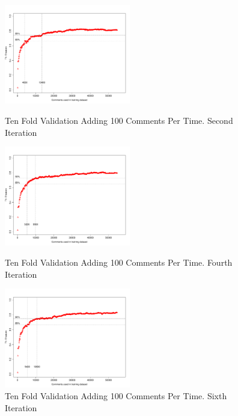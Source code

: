 \begin{figure}[thb!]
  \centering
  \vspace{-14mm}
  \includegraphics[width=0.49\textwidth]{figures/appendix/ten_fold_validation_design/ten_fold_validation_1_100.pdf}
  \vspace{-5mm}
  \caption{Ten Fold Validation Adding 100 Comments Per Time. Second Iteration}
  \label{fig:design_ten_fold_validation_1_100}
  \includegraphics[width=0.49\textwidth]{figures/appendix/ten_fold_validation_design/ten_fold_validation_3_100.pdf}
  \vspace{-5mm}
  \caption{Ten Fold Validation Adding 100 Comments Per Time. Fourth Iteration}
  \label{fig:design_ten_fold_validation_3_100}
  \includegraphics[width=0.49\textwidth]{figures/appendix/ten_fold_validation_design/ten_fold_validation_5_100.pdf}
  \vspace{-5mm}
  \caption{Ten Fold Validation Adding 100 Comments Per Time. Sixth Iteration}
  \label{fig:design_ten_fold_validation_5_100}
\end{figure}

